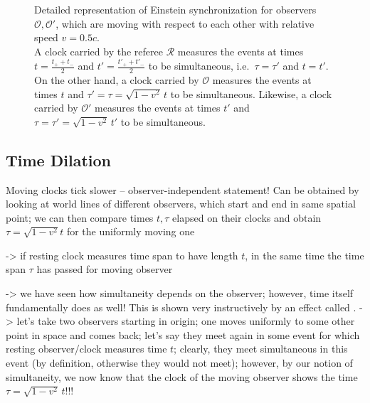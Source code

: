{\begin{figure}
\caption{Detailed representation of Einstein synchronization for observers $\mathcal{O}, \mathcal{O}'$, which are moving with respect to each other with relative speed $v = 0.5 c$.\\
A clock carried by the referee $\mathcal{R}$ measures the events at times $t = \frac{t_+ + t_-}{2}$ and $t' = \frac{t'_+ + t'_-}{2}$ to be simultaneous, i.e.~$\tau = \tau'$ and $t = t'$.\protect\footnotemark\\
On the other hand, a clock carried by $\mathcal{O}$ measures the events at times $t$ and $\tau' = \tau = \sqrt{1 - v^2} \, t$ to be simultaneous. Likewise, a clock carried by $\mathcal{O}'$ measures the events at times $t'$ and $\tau = \tau' = \sqrt{1 - v^2} \, t'$ to be simultaneous.}
\end{figure}

}
\fi



		\subsection{Time Dilation}
Moving clocks tick slower -- observer-independent statement! Can be obtained by looking at world lines of different observers, which start and end in same spatial point; we can then compare times $t, \tau$ elapsed on their clocks and obtain $\tau = \sqrt{1 - v^2} t$ for the uniformly moving one

-> if resting clock measures time span to have length $t$, in the same time the time span $\tau$ has passed for moving observer


-> we have seen how simultaneity depends on the observer; however, time itself fundamentally does as well! This is shown very instructively by an effect called . -> let's take two observers starting in origin; one moves uniformly to some other point in space and comes back; let's say they meet again in some event for which resting observer/clock measures time $t$; clearly, they meet simultaneous in this event (by definition, otherwise they would not meet); however, by our notion of simultaneity, we now know that the clock of the moving observer shows the time $\tau = \sqrt{1 - v^2} \, t$!!!



